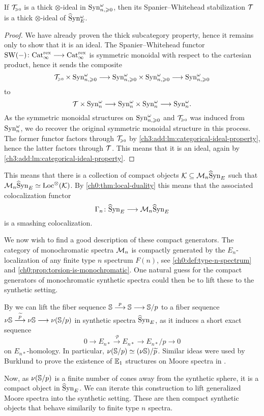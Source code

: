 \begin{lemma}
    \label{ch3:add:lm:stabilizing-ideal-gives-ideal}
    If $\T\geqz$ is a thick $\otimes$-ideal in $\Syn_{n, \geq 0}^\omega$, then its Spanier--Whitehead stabilization $\T$ is a thick $\otimes$-ideal of $\hSynE^\omega$. 
\end{lemma}
\begin{proof}
    We have already proven the thick subcategory property, hence it remains only to show that it is an ideal. The Spanier--Whitehead functor $\SW(-)\: \Cat_\infty^{\mathrm{rex}}\to \Cat_\infty^{\mathrm{rex}}$ is symmetric monoidal with respect to the cartesian product, hence it sends the composite 
    \[\T\geqz\times \Syn_{n, \geq 0}^\omega \to \Syn_{n, \geq 0}^\omega\times \Syn_{n, \geq 0}^\omega \to \Syn_{n, \geq 0}^\omega\]
    to 
    \[\T\times \Syn_{n}^\omega \to \Syn_{n}^\omega\times \Syn_{n}^\omega\to \Syn_{n}^\omega.\]
    As the symmetric monoidal structures on $\Syn_{n, \geq 0}^\omega$ and $\T\geqz$ was induced from $\Syn_{n}^\omega$, we do recover the original symmetric monoidal structure in this process. The former functor factors through $\T\geqz$ by \cref{ch3:add:lm:categorical-ideal-property}, hence the latter factors through $\T$. This means that it is an ideal, again by \cref{ch3:add:lm:categorical-ideal-property}. 
\end{proof}

\begin{remark}
    This means that there is a collection of compact objects $\K \subseteq \Mn\hSynE$ such that $\Mn\hSynE \simeq \Loc^\otimes (\K)$. By \cref{ch0:thm:local-duality} this means that the associated colocalization functor
    \[\Gamma_n\: \hSynE \to \Mn\hSynE\]
    is a smashing colocalization. 
\end{remark}

We now wish to find a good description of these compact generators. The category of monochromatic spectra $\Mn$ is compactly generated by the $E_n$-localization of any finite type $n$ spectrum $F(n)$, see \cref{ch0:def:type-n-spectrum} and \cref{ch0:prop:torsion-is-monochromatic}. One natural guess for the compact generators of monochromatic synthetic spectra could then be to lift these to the synthetic setting. 

\begin{construction}
    By \cite[4.23]{pstragowski_2022} we can lift the fiber sequence $\S\overset{p}\to\S\to\S/p$ to a fiber sequence $\nu \S \overset{\widetilde{p}}\to \nu \S\to \nu (\S/p)$ in synthetic spectra $\hSynE$, as it induces a short exact sequence 
    \[0\to E_{n*} \overset{\cdot p}\to E_{n*}\to E_{n*}/p\to 0\]
    on $E_{n*}$-homology. In particular, $\nu (\S/p)\simeq (\nu \S)/\widetilde{p}$. Similar ideas were used by Burklund to prove the existence of $\E_1$ structures on Moore spectra in \cite{burklund_2022}. 
    
    Now, as $\nu (\S/p)$ is a finite number of cones away from the synthetic sphere, it is a compact object in $\hSynE$. We can iterate this construction to lift generalized Moore spectra into the synthetic setting. These are then compact synthetic objects that behave similarily to finite type $n$ spectra. 
\end{construction}

